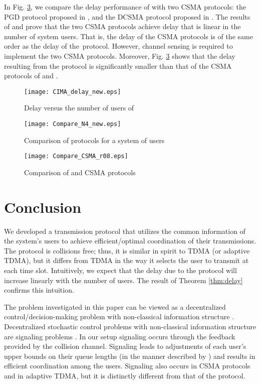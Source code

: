 \documentclass[onecolumn,draftcls]{IEEEtran}
\begin{document}
In Fig. \ref{fig:Compare_CSMA}, we compare the delay performance of  with two CSMA protocols: 
the PGD protocol proposed in \cite{jiang2012fast}, and the DCSMA protocol proposed in \cite{lee2014provable}.
The results of \cite{jiang2012fast} and \cite{lee2014provable} prove that the two CSMA protocols achieve delay that is linear in the number of system users.
That is, the delay of the CSMA protocols is of the same order as the delay of the\  protocol.
However, channel sensing is required to implement the two CSMA protocols.
Moreover, Fig. \ref{fig:Compare_CSMA} shows that the delay resulting from the  protocol is significantly smaller than that of the CSMA protocols of \cite{jiang2012fast} and \cite{lee2014provable}.



\begin{figure}
\texttt{[image: CIMA\_delay\_new.eps]}
\caption{Delay versus the number of users of }
\label{fig:CIMA}
\end{figure}
\begin{figure}
\texttt{[image: Compare\_N4\_new.eps]}
\caption{Comparison of protocols for a system of  users}
\label{fig:Compare}
\end{figure}

\begin{figure}
\texttt{[image: Compare\_CSMA\_r08.eps]}
\caption{Comparison of  and CSMA protocols}
\label{fig:Compare_CSMA}
\end{figure}


\section{Conclusion}
\label{sec:conclusion}
We developed a transmission protocol that utilizes the common information of the system's users to achieve efficient/optimal coordination of their transmissions.
The protocol is collisions free; thus, it is similar in spirit to TDMA (or adaptive TDMA), but it differs from TDMA in the way it selects the user to transmit at each time slot.
Intuitively, we expect that the delay due to the  protocol will increase linearly with the number of users. The result of Theorem \ref{thm:delay} confirms this intuition.

The problem investigated in this paper can be viewed as a decentralized control/decision-making problem with non-classical information structure \cite{witsenhausen1971separation}. Decentralized stochastic control problems with non-classical information structure are signaling problems \cite{ho1980team}. In our setup signaling occurs through the feedback provided by the collision channel. Signaling leads to adjustments of each user's upper bounds on their queue lengths (in the manner described by ) and results in efficient coordination among the users.
Signaling also occurs in CSMA protocols and in adaptive TDMA, but it is distinctly different from that of the  protocol.
\end{document}
